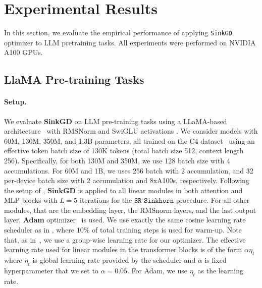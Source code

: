 
\section{Experimental Results}
\label{sec:pretrain}
In this section, we evaluate the empirical performance of applying \texttt{SinkGD} optimizer to LLM pretraining tasks. All experiments were performed on NVIDIA A100 GPUs.


\subsection{LlaMA Pre-training Tasks} 

\paragraph{Setup.} We evaluate \textbf{SinkGD} on LLM pre-training tasks using a LLaMA-based architecture~\cite{touvron2023llama} with RMSNorm and SwiGLU activations \citep{zhang2019root, gao2023eigenvalue}. We consider models with 60M, 130M, 350M, and 1.3B parameters, all trained on the C4 dataset~\cite{2020t5} using an effective token batch size of 130K tokens (total batch size 512, context length 256). Specifically, for both 130M and 350M, we use 128 batch size with 4 accumulations. For 60M and 1B, we uses 256 batch with 2 accumulation, and 32 per-device batch size with 2 accumulation and 8xA100s, respectively.
Following the setup of \cite{Zhao2024GaLoreML, zhu2024apollo}, $\textbf{SinkGD}$ is applied to all linear modules in both attention and MLP blocks with $L=5$ iterations for the $\texttt{SR-Sinkhorn}$ procedure. For all other modules, that are the embedding layer, the RMSnorm layers, and the last output layer, \textbf{Adam} optimizer~\cite{adam} is used. We use exactly the same cosine learning rate scheduler as in \cite{Zhao2024GaLoreML}, where $10\%$ of total training steps is used for warm-up. Note that, as in~\cite{Zhao2024GaLoreML,zhu2024apollo}, we use a group-wise learning rate for our optimizer. The effective learning rate used for linear modules in the transformer blocks is of the form $\alpha \eta_t$ where $\eta_t$ is global learning rate provided by the scheduler and $\alpha$ is fixed hyperparameter that we set to $\alpha=0.05$. For Adam, we use $\eta_t$ as the learning rate. 

